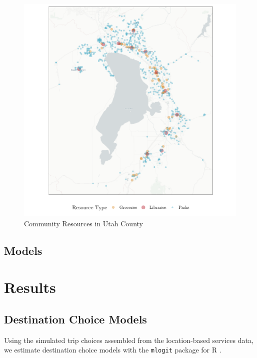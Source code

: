 \documentclass[3p, authoryear]{elsarticle} %
\begin{document}
\begin{figure}

{\centering \includegraphics{Community_Resources_files/figure-latex/utco-map-1} 

}

\caption{Community Resources in Utah County}\label{fig:utco-map}
\end{figure}

\hypertarget{models}{%
\subsection{Models}\label{models}}

\hypertarget{results}{%
\section{Results}\label{results}}

\hypertarget{destination-choice-models}{%
\subsection{Destination Choice Models}\label{destination-choice-models}}

Using the simulated trip choices assembled from the location-based services data,
we estimate destination choice models with the \texttt{mlogit} package for
R \citep{R, mlogit}.
\end{document}
